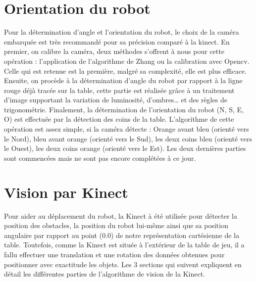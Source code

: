 \section{Orientation du robot}

Pour la détermination d’angle et l’orientation du robot, le choix de la caméra embarquée  est très recommandé pour sa précision comparé à la kinect. En premier, on calibre la caméra, deux méthodes s’offrent à nous pour cette opération : l’application de l’algorithme de Zhang ou la calibration avec Opencv. Celle qui est retenue est la première, malgré sa complexité, elle est plus efficace. Ensuite, on procède à la détermination d’angle du robot par rapport à la ligne rouge déjà tracée sur la table, cette partie est réalisée grâce à un traitement d’image supportant la variation de luminosité, d’ombres… et des règles de trigonométrie. Finalement,  la détermination de l’orientation du robot (N, S, E, O) est effectuée par la détection des coins de la table. L’algorithme de cette opération est assez simple, si la caméra détecte : Orange avant bleu (orienté vers le Nord), bleu avant orange (orienté vers le Sud), les deux coins bleu (orienté vers le Ouest), les deux coins orange (orienté vers le Est). Les deux dernières parties sont commencées mais ne sont pas encore complétées à ce jour.

\section{Vision par Kinect}
Pour aider au déplacement du robot, la Kinect à été utilisée pour détecter la position des obstacles, la position du robot lui-même ainsi que sa position angulaire par rapport au point (0.0) de notre représentation cartésienne de la table. Toutefois, comme la Kinect est située à l'extérieur de la table de jeu, il a fallu effectuer une translation et une rotation des données obtenues pour positionner avec exactitude les objets. Les 3 sections qui suivent expliquent en détail les différentes parties de l'algorithme de vision de la Kinect.

